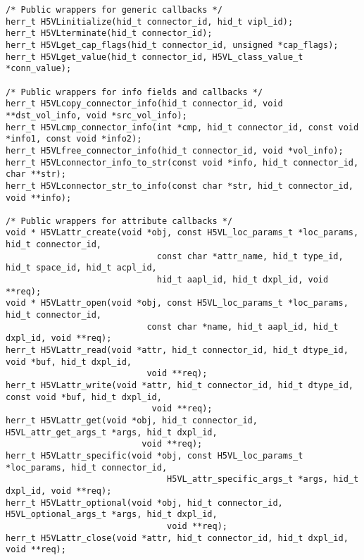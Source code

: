 \begin{appendices}
\begin{lstlisting}
/* Public wrappers for generic callbacks */
herr_t H5VLinitialize(hid_t connector_id, hid_t vipl_id);
herr_t H5VLterminate(hid_t connector_id);
herr_t H5VLget_cap_flags(hid_t connector_id, unsigned *cap_flags);
herr_t H5VLget_value(hid_t connector_id, H5VL_class_value_t *conn_value);

/* Public wrappers for info fields and callbacks */
herr_t H5VLcopy_connector_info(hid_t connector_id, void **dst_vol_info, void *src_vol_info);
herr_t H5VLcmp_connector_info(int *cmp, hid_t connector_id, const void *info1, const void *info2);
herr_t H5VLfree_connector_info(hid_t connector_id, void *vol_info);
herr_t H5VLconnector_info_to_str(const void *info, hid_t connector_id, char **str);
herr_t H5VLconnector_str_to_info(const char *str, hid_t connector_id, void **info);

/* Public wrappers for attribute callbacks */
void * H5VLattr_create(void *obj, const H5VL_loc_params_t *loc_params, hid_t connector_id,
                              const char *attr_name, hid_t type_id, hid_t space_id, hid_t acpl_id,
                              hid_t aapl_id, hid_t dxpl_id, void **req);
void * H5VLattr_open(void *obj, const H5VL_loc_params_t *loc_params, hid_t connector_id,
                            const char *name, hid_t aapl_id, hid_t dxpl_id, void **req);
herr_t H5VLattr_read(void *attr, hid_t connector_id, hid_t dtype_id, void *buf, hid_t dxpl_id,
                            void **req);
herr_t H5VLattr_write(void *attr, hid_t connector_id, hid_t dtype_id, const void *buf, hid_t dxpl_id,
                             void **req);
herr_t H5VLattr_get(void *obj, hid_t connector_id, H5VL_attr_get_args_t *args, hid_t dxpl_id,
                           void **req);
herr_t H5VLattr_specific(void *obj, const H5VL_loc_params_t *loc_params, hid_t connector_id,
                                H5VL_attr_specific_args_t *args, hid_t dxpl_id, void **req);
herr_t H5VLattr_optional(void *obj, hid_t connector_id, H5VL_optional_args_t *args, hid_t dxpl_id,
                                void **req);
herr_t H5VLattr_close(void *attr, hid_t connector_id, hid_t dxpl_id, void **req);


\end{lstlisting}
\end{appendices}
